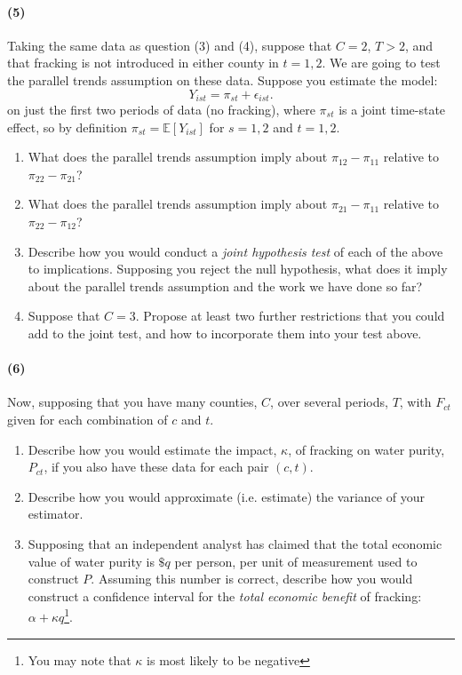 \documentclass[12pt]{article}
\newcommand\EE{\mathbb{E}}
\newcommand\eps{\epsilon}
\numberwithin{equation}{section}
\numberwithin{figure}{section}
\numberwithin{table}{section}
\begin{document}
\paragraph{(5)} Taking the same data as question (3) and (4), suppose that $C=2$, $T>2$, and that fracking is not introduced in either county in $t=1,2$. We are going to test the parallel trends assumption on these data. Suppose you estimate the model:
\[ Y_{ist} = \pi_{st} + \eps_{ist}.\]
on just the first two periods of data (no fracking), where $\pi_{st}$ is a joint time-state effect, so by definition $\pi_{st}=\EE[Y_{ist}]$ for $s=1,2$ and $t=1,2$.
\begin{enumerate}
\item What does the parallel trends assumption imply about $\pi_{12}-\pi_{11}$ relative to $\pi_{22}-\pi_{21}$?
\item What does the parallel trends assumption imply about $\pi_{21}-\pi_{11}$ relative to $\pi_{22}-\pi_{12}$?
\item Describe how you would conduct a \emph{joint hypothesis test} of each of the above to implications. Supposing you reject the null hypothesis, what does it imply about the parallel trends assumption and the work we have done so far?
\item Suppose that $C=3$. Propose at least two further restrictions that you could add to the joint test, and how to incorporate them into your test above.
\end{enumerate}

\paragraph{(6)} Now, supposing that you have many counties, $C$, over several periods, $T$, with $F_{ct}$ given for each combination of $c$ and $t$.
\begin{enumerate}
\item Describe how you would estimate the impact, $\kappa$, of fracking on water purity, $P_{ct}$, if you also have these data for each pair $(c,t)$. 
\item Describe how you would approximate (i.e. estimate) the variance of your estimator.
\item Supposing that an independent analyst has claimed that the total economic value of water purity is $\$q$ per person, per unit of measurement used to construct $P$. Assuming this number is correct, describe how you would construct a confidence interval for the \emph{total economic benefit} of fracking: $\alpha + \kappa q$\footnote{You may note that $\kappa$ is most likely to be negative}.
\end{enumerate}
\end{document}
